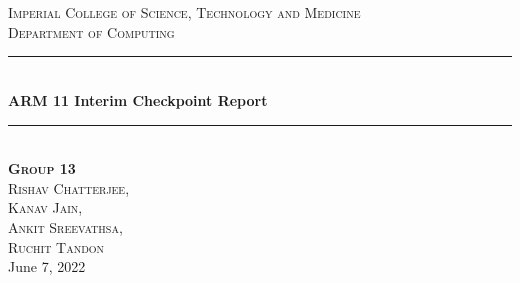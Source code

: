 \documentclass[a4paper]{article}
\begin{document}
\begin{titlepage}
\newcommand{\HRule}{\rule{\linewidth}{0.5mm}} %
\setlength{\topmargin}{0in}
\center %
\begin{minipage}{0.4\textwidth}
\begin{flushleft} \large
\hspace*{-0.5cm}
\end{flushleft}
\end{minipage}
~
\begin{minipage}{0.5\textwidth}
\begin{flushright} \large
\hspace*{2cm}
\end{flushright}
\end{minipage}\\[1cm]


\textsc{\LARGE Imperial College of Science, Technology and Medicine}\\[1.5cm] 
\textsc{\Large Department of Computing}\\[0.5cm] 

\HRule \\[0.4cm]
{ \huge \bfseries ARM 11 Interim Checkpoint Report}\\[0.4cm]
\HRule \\[1cm]
 


\textsc{{\large
\textbf{Group 13} \\
Rishav \textsc{Chatterjee}, \\
Kanav \textsc{Jain}, \\ 
Ankit \textsc{Sreevathsa}, \\
Ruchit \textsc{Tandon} }}\\[0.5cm]


{\large June 7, 2022}\\[0.5cm] 

\vfill 
\end{titlepage}

\newpage
\end{document}
